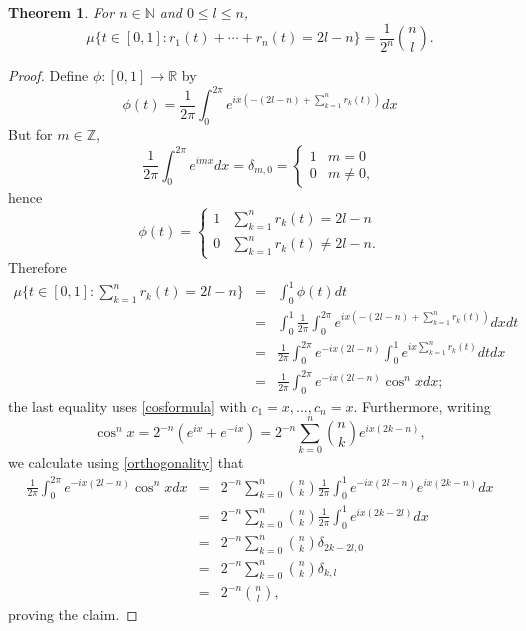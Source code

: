 \documentclass{article}
\newtheorem{theorem}{Theorem}
\theoremstyle{definition}
\begin{document}
\begin{theorem}
For $n \in \mathbb{N}$ and $0 \leq l \leq n$,
\[
\mu\{t \in [0,1]: r_1(t)+\cdots+r_n(t)=2l-n\} = \frac{1}{2^n} \binom{n}{l}.
\]
\label{numberheads}
\end{theorem}
\begin{proof}
Define $\phi:[0,1] \to \mathbb{R}$ by
\[
\phi(t) = \frac{1}{2\pi} \int_0^{2\pi} e^{ix\left(-(2l-n)+\sum_{k=1}^n r_k(t)\right)} dx
\]
But for $m \in \mathbb{Z}$,
\begin{equation}
\frac{1}{2\pi} \int_0^{2\pi} e^{imx} dx =\delta_{m,0}= \begin{cases}
1&m=0\\
0&m \neq0,
\end{cases}
\label{orthogonality}
\end{equation}
hence
\[
\phi(t)=
\begin{cases}
1&\sum_{k=1}^n r_k(t)=2l-n\\
0&\sum_{k=1}^n r_k(t) \neq 2l-n.
\end{cases}
\]
Therefore
\begin{eqnarray*}
\mu \bigg\{ t \in [0,1]: \sum_{k=1}^n r_k(t) = 2l-n\bigg\} & = & \int_0^1 \phi(t) dt\\
&=&\int_0^1  \frac{1}{2\pi} \int_0^{2\pi} e^{ix\left(-(2l-n)+\sum_{k=1}^n r_k(t)\right)} dx dt\\
&=&\frac{1}{2\pi}  \int_0^{2\pi} e^{-ix(2l-n)} \int_0^1  e^{ix\sum_{k=1}^n r_k(t)} dt dx\\
&=&\frac{1}{2\pi}  \int_0^{2\pi} e^{-ix(2l-n)} \cos^n x dx;
\end{eqnarray*}
the last equality uses \eqref{cosformula} with $c_1=x,\ldots,c_n=x$. 
Furthermore, writing
\[
\cos^n x = 2^{-n} (e^{ix}+e^{-ix}) = 2^{-n} \sum_{k=0}^n \binom{n}{k} e^{ix(2k-n)},
\]
we calculate using \eqref{orthogonality} that
\begin{eqnarray*}
\frac{1}{2\pi} \int_0^{2\pi} e^{-ix(2l-n)} \cos^n x dx&=&2^{-n} \sum_{k=0}^n \binom{n}{k}  \frac{1}{2\pi}\int_0^1 e^{-ix(2l-n)} e^{ix(2k-n)} dx\\
 &=&2^{-n}  \sum_{k=0}^n \binom{n}{k} \frac{1}{2\pi} \int_0^1 e^{ix(2k-2l)} dx\\
 &=&2^{-n}  \sum_{k=0}^n \binom{n}{k} \delta_{2k-2l,0}\\
 &=&2^{-n}  \sum_{k=0}^n \binom{n}{k} \delta_{k,l}\\
 &=&2^{-n} \binom{n}{l},
\end{eqnarray*}
proving the claim.
\end{proof}
\end{document}
